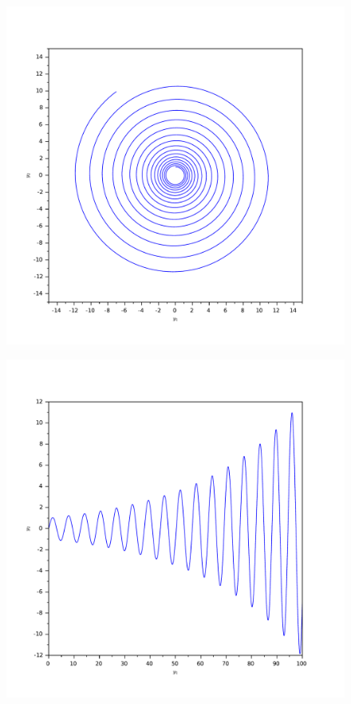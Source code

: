 \documentclass[11pt]{article}
\begin{document}
\begin{figure}[H]
\centering
\includegraphics[scale=0.4]{images/soal_01_ode_euler_y1_y2.pdf}
\par
\end{figure}

\begin{figure}[H]
\centering
\includegraphics[scale=0.4]{images/soal_01_ode_euler_t_y1.pdf}
\par
\end{figure}
\end{document}
